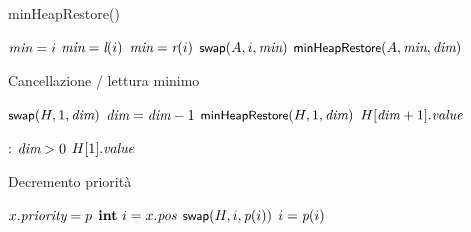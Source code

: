 \begin{frame}{minHeapRestore()}
    
\vspace{-9pt}
\begin{Procedure}
\caption[A]{\minheapify($\PriorityItem[\,]\ A$, \INTEGER $i$, \INTEGER \heapcount)}

\INTEGER $\textit{min} = i$\;
{
  $\textit{min} = \textit{l}(i)$
}
{
  $\textit{min} = \textit{r}(i)$
}
{
  $\textsf{{\small swap}}(A, i, \textit{min})$\;
  $\textsf{{\small minHeapRestore}}(A, \textit{min}, \textit{dim})$\;
}
\end{Procedure}

\end{frame}

\begin{frame}{Cancellazione / lettura minimo}

\vspace{-9pt}
\begin{Procedure}
\caption[A]{\Item\ \heapdeletemin()}
\BlankLine
$\textsf{{\small swap}}(H, 1, \textit{dim})$\;
$\textit{dim} = \textit{dim}-1$\;
$\textsf{{\small minHeapRestore}}(H, 1, \textit{dim})$\;
\Return $H[\textit{dim}+1].\textit{value}$\;
\end{Procedure}

\begin{Procedure}
\caption[A]{\Item \heapmin()}
  \PRECONDITION: $\textit{dim} > 0$\; 
  \BlankLine
  \Return $H[1].\textit{value}$\;
\end{Procedure}

\end{frame}

\begin{frame}{Decremento priorità}

\vspace{-9pt}
\begin{Procedure}
\caption[A]{\heapdecrease(\PriorityItem\ $x$, \INTEGER\ $p$)}
\BlankLine
{
  $x.\textit{priority} = p$\;
  $\INTEGER\ i = x.\heappos$\;
  {
    $\textsf{{\small swap}}(H, i, \textit{p}(i))$\;
    $i = \textit{p}(i)$\; 
  }
}
\end{Procedure}


\end{frame}

